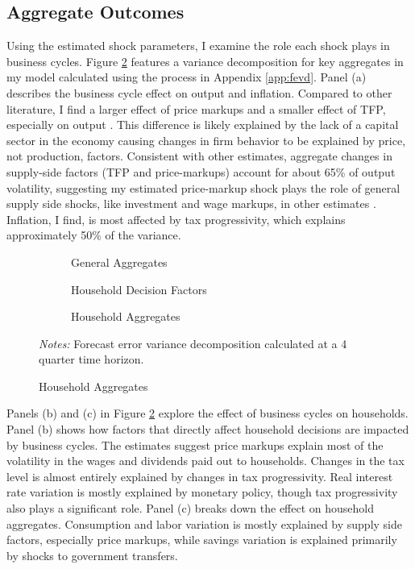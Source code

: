 \subsection{Aggregate Outcomes}

Using the estimated shock parameters, I examine the role each shock plays in business cycles. Figure \ref{fig:agg-var-decomp} features a variance decomposition for key aggregates in my model calculated using the process in Appendix \ref{app:fevd}. Panel (a) describes the business cycle effect on output and inflation. Compared to other literature, I find a larger effect of price markups and a smaller effect of TFP, especially on output \autocites{smets2007shocks}{bayer2024shocks}. This difference is likely explained by the lack of a capital sector in the economy causing changes in firm behavior to be explained by price, not production, factors. Consistent with other estimates, aggregate changes in supply-side factors (TFP and price-markups) account for about 65\% of output volatility, suggesting my estimated price-markup shock plays the role of general supply side shocks, like investment and wage markups, in other estimates \autocite{bayer2024shocks}. Inflation, I find, is most affected by tax progressivity, which explains approximately 50\% of the variance.

\begin{figure}[t]
    \centering
    \caption{Variance Decomposition: Aggregates}
    \begin{subfigure}[t]{\textwidth}
        \centering
        \caption{General Aggregates}
        
        \label{subfig:gen-aggs}
    \end{subfigure}
    \begin{subfigure}[t]{\textwidth}
        \centering
        \caption{Household Decision Factors}
        
    \end{subfigure}
    \begin{subfigure}[t]{\textwidth}
        \centering
        \caption{Household Aggregates}
        
    \end{subfigure}
    {\scriptsize \textit{Notes:} Forecast error variance decomposition calculated at a 4 quarter time horizon.}
    \label{fig:agg-var-decomp}
\end{figure}

Panels (b) and (c) in Figure \ref{fig:agg-var-decomp} explore the effect of business cycles on households. Panel (b) shows how factors that directly affect household decisions are impacted by business cycles. The estimates suggest price markups explain most of the volatility in the wages and dividends paid out to households. Changes in the tax level is almost entirely explained by changes in tax progressivity. Real interest rate variation is mostly explained by monetary policy, though tax progressivity also plays a significant role. Panel (c) breaks down the effect on household aggregates. Consumption and labor variation is mostly explained by supply side factors, especially price markups, while savings variation is explained primarily by shocks to government transfers.


